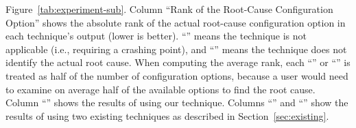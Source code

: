 \begin{figure*}[t]
{{Figure~\ref{tab:experiment-sub}. 
Column ``Rank of the Root-Cause Configuration Option'' shows the
absolute rank of the actual root-cause
configuration option in each technique's output (lower is better).
``\x'' means the technique is not applicable (i.e., requiring a crashing
point), and ``\n'' means the technique does not identify the actual root cause.
When computing the average rank, each ``\x'' or ``\n'' is treated as
half of the number of configuration options, because a user would need to examine
on average half of the available options to find the root cause.
Column ``\ourtool'' shows the results
of using our technique. Columns ``\prevtool'' and ``\conftool'' show
the results of using two existing techniques as described in Section~\ref{sec:existing}.
}
}
\end{figure*}
